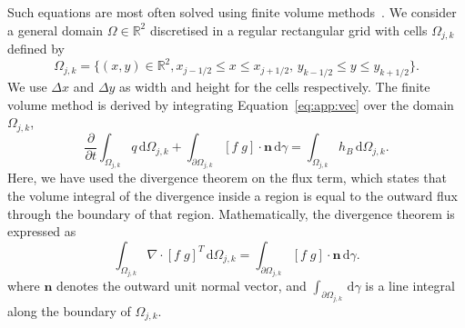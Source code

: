 \documentclass[11pt, a4paper]{article}
\newcommand{\drm}[0]{\,\mathrm{d}}
\newcommand{\vecn}[0]{\bm{n}}
\newcommand{\partder}[2]{\frac{\partial #1}{\partial #2}}
\begin{document}
Such equations are most often solved using finite volume methods~\cite{LevequeFVM2004}.
We consider a general domain $\Omega \in \mathbb{R}^2$ discretised in a regular rectangular grid with cells $\Omega_{j,k}$ defined by
\begin{equation*}
	\Omega_{j,k} =  \{ (x,y) \in \mathbb{R}^2, x_{j-1/2} \leq x \leq x_{j+1/2}, \, y_{k-1/2} \leq y \leq y_{k+1/2} \}.
	\label{eq:app:domain}
\end{equation*}
We use $\Delta x$ and $\Delta y$ as width and height for the cells respectively.
The finite volume method is derived by integrating Equation~\eqref{eq:app:vec} over the domain $\Omega_{j,k}$,
\begin{equation}
	\partder{}{t} \int_{\Omega_{j,k}} q \drm \Omega_{j,k} + \int_{\partial \Omega_{j,k}} [f \; g] \cdot \vecn \drm \gamma = \int_{\Omega_{j,k}} h_B \drm \Omega_{j,k}.
	\label{eq:app:gen}	
\end{equation}
Here, we have used the divergence theorem on the flux term, which states that the volume integral of the divergence inside a region is equal to the outward flux through the boundary of that region.
Mathematically, the divergence theorem is expressed as
\begin{equation*}
	\int_{\Omega_{j,k}} \nabla \cdot [f \; g]^T \drm \Omega_{j,k} = \int_{\partial \Omega_{j,k}} [f \; g] \cdot \vecn \drm \gamma.
	\label{eq:app:divergencetheorem}
\end{equation*}
where $\vecn$ denotes the outward unit normal vector, and $\int_{\partial \Omega_{j,k}}  \drm \gamma$ is a line integral along the boundary of $\Omega_{j,k}$.
\end{document}
